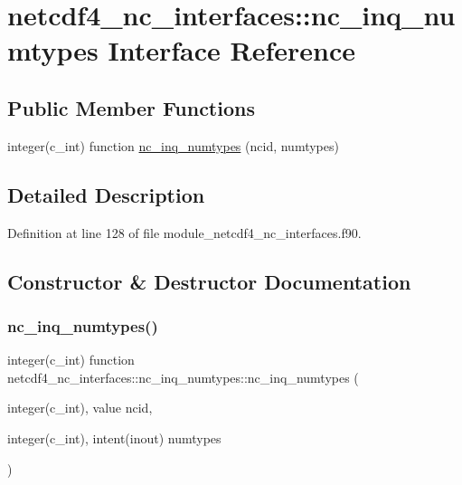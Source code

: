 \hypertarget{interfacenetcdf4__nc__interfaces_1_1nc__inq__numtypes}{}\section{netcdf4\+\_\+nc\+\_\+interfaces\+:\+:nc\+\_\+inq\+\_\+numtypes Interface Reference}
\label{interfacenetcdf4__nc__interfaces_1_1nc__inq__numtypes}
\subsection*{Public Member Functions}
\begin{DoxyCompactItemize}
\item 
integer(c\+\_\+int) function \hyperlink{interfacenetcdf4__nc__interfaces_1_1nc__inq__numtypes_a22d7495b32a3fa917dc4aa1a24943861}{nc\+\_\+inq\+\_\+numtypes} (ncid, numtypes)
\end{DoxyCompactItemize}


\subsection{Detailed Description}


Definition at line 128 of file module\+\_\+netcdf4\+\_\+nc\+\_\+interfaces.\+f90.



\subsection{Constructor \& Destructor Documentation}
\mbox{\label{interfacenetcdf4__nc__interfaces_1_1nc__inq__numtypes_a22d7495b32a3fa917dc4aa1a24943861}} 
\subsubsection{\texorpdfstring{nc\+\_\+inq\+\_\+numtypes()}{nc\_inq\_numtypes()}}
{\footnotesize\ttfamily integer(c\+\_\+int) function netcdf4\+\_\+nc\+\_\+interfaces\+::nc\+\_\+inq\+\_\+numtypes\+::nc\+\_\+inq\+\_\+numtypes (\begin{DoxyParamCaption}\item[{integer(c\+\_\+int), value}]{ncid,  }\item[{integer(c\+\_\+int), intent(inout)}]{numtypes }\end{DoxyParamCaption})}



